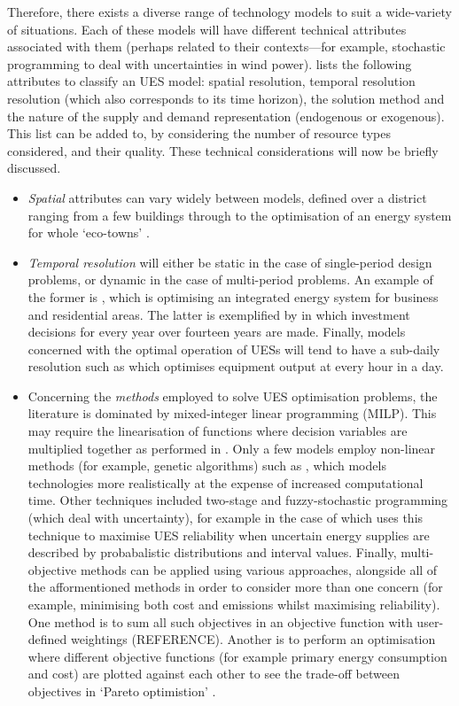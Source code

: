 Therefore, there exists a diverse range of technology models to suit a wide-variety of situations. Each of these models will have different technical attributes associated with them (perhaps related to their contexts---for example, stochastic programming to deal with uncertainties in wind power). \citet{Keirstead2012b} lists the following attributes to classify an UES model: spatial resolution, temporal resolution resolution (which also corresponds to its time horizon), the solution method and the nature of the supply and demand representation (endogenous or exogenous). This list can be added to, by considering the number of resource types considered, and their quality. These technical considerations will now be briefly discussed.
\begin{itemize}
	\item \emph{Spatial} attributes can vary widely between models, defined over a district ranging from a few buildings \citep{Bojic2010} through to the optimisation of an energy system for whole `eco-towns' \citep{Keirstead2012}. 
	\item \emph{Temporal resolution} will either be static in the case of single-period design problems, or dynamic in the case of multi-period problems. An example of the former is \citet{Sugihara2004}, which is optimising an integrated energy system for business and residential areas. The latter is exemplified by\citet{Sirikitputtisak2009} in which investment decisions for every year over fourteen years are made. Finally, models concerned with the optimal operation of UESs will tend to have a sub-daily resolution such as \citet{Ooka2009} which optimises equipment output at every hour in a day. 
	\item Concerning the \emph{methods} employed to solve UES optimisation problems, the literature is dominated by mixed-integer linear programming (MILP). This may require the linearisation of functions where decision variables are multiplied together as performed in \citet{Sirikitputtisak2009}. Only a few models employ non-linear methods (for example, genetic algorithms) such as \citet{Ooka2009}, which models technologies more realistically at the expense of increased computational time. Other techniques included two-stage and fuzzy-stochastic programming (which deal with uncertainty), for example in the case of \citet{Cai2009a} which uses this technique to maximise UES reliability when uncertain energy supplies are described by probabalistic distributions and interval values. Finally, multi-objective methods can be applied using various approaches, alongside all of the afformentioned methods in order to consider more than one concern (for example, minimising both cost and emissions whilst maximising reliability). One method is to sum all such objectives in an objective function with user-defined weightings (REFERENCE). Another is to perform an optimisation where different objective functions (for example primary energy consumption and cost) are plotted against each other to see the trade-off between objectives in `Pareto optimistion' \citep{Sugihara2004}.

\end{itemize}
